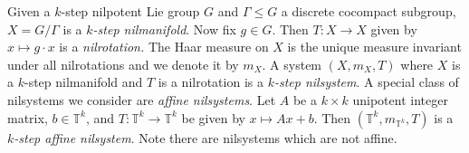 \documentclass[12pt]{amsart}
\theoremstyle{definition}
\theoremstyle{plain}
\newtheorem{definition}[theorem]{Definition}
\theoremstyle{definition}
\numberwithin{equation}{section}
\begin{document}








Given a $k$-step nilpotent Lie group $G$ and $\Gamma \leq G$ a discrete cocompact subgroup, $X=G/\Gamma$ is a \textit{$k$-step nilmanifold}. Now fix $g \in G$. Then $T\colon X \rightarrow X$ given by $x \mapsto  g \cdot x$ is a \textit{nilrotation.} The Haar measure on $X$ is the unique measure invariant under all nilrotations and we denote it by $m_X$. A system $(X,m_X,T)$ where $X$ is a $k$-step nilmanifold and $T$ is a nilrotation is a \textit{$k$-step nilsystem}. A special class of nilsystems we consider are \textit{affine nilsystems}. Let $A$ be a $k\times k$ unipotent integer matrix, $b\in \mathbb{T}^{k}$, and $T\colon \mathbb{T}^{k} \rightarrow \mathbb{T}^{k}$ be given by $x \mapsto Ax+b$. Then $(\mathbb{T}^{k},m_{\mathbb{T}^{k}},T)$ is a \textit{$k$-step affine nilsystem}. Note there are nilsystems which are not affine.


\end{document}
